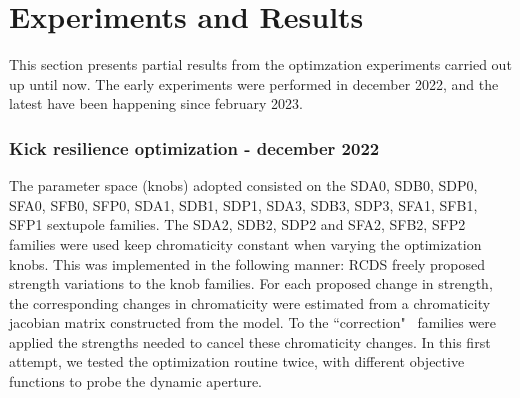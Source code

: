 \chapter{Experiments and Results}
This section presents partial results from the optimzation experiments carried out up until now. The early experiments were performed in december 2022, and the latest have been happening since february 2023.
\subsection{Kick resilience optimization - december 2022}
\label{experiments22}
The parameter space (knobs) adopted consisted on the SDA0, SDB0, SDP0, SFA0, SFB0, SFP0, SDA1, SDB1, SDP1, SDA3, SDB3, SDP3, SFA1, SFB1, SFP1 sextupole families. The SDA2, SDB2, SDP2 and SFA2, SFB2, SFP2 families were used keep chromaticity constant when varying the optimization knobs. This was implemented in the following manner: RCDS freely proposed strength variations to the knob families. For each proposed change in strength, the corresponding changes in chromaticity were estimated from a chromaticity jacobian matrix constructed from the model. To the ``correction"~ families were applied the strengths needed to cancel these chromaticity changes. In this first attempt, we tested the optimization routine twice, with different objective functions to probe the dynamic aperture.
